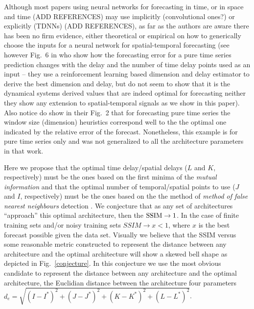 \documentclass[journal]{IEEEtran}
\begin{document}
Although most papers using neural networks for forecasting in time, or in space and time (ADD REFERENCES) may use implicitly 
(convolutional ones?) or explicitly (TDNNs) (ADD REFERENCES), as far as the authors are aware there has been no firm evidence, either 
theoretical or empirical on how to generically choose the inputs for a neural network for spatial-temporal forecasting (see however 
Fig.\ 6 in \cite{1555956} who show how the forecasting error for a pure time series prediction changes with the delay and the number of 
time delay points used as an input -- they use a reinforcement learning based dimension and delay estimator to derive the best dimension 
and delay, but do not seem to show that it is the dynamical systems derived values that are indeed optimal for forecasting neither
they show any extension to spatial-temporal signals as we show in this paper). Also notice \cite{Frank2001} do show in their Fig.\ 2
that for forecasting pure time series the window size (dimension) heuristics correspond well to the the optimal one indicated by 
the relative error of the forecast. Nonetheless, this example is for pure time series only and was not generalized to all
the architecture parameters in that work.

Here we propose that the optimal time delay/spatial delays ($L$ and $K$, respectively) must be the ones based on the first minima of the {\em mutual information}
\cite{Fraser86, abarbanel1997analysis, opac-b1092652} and that the optimal number of temporal/spatial points to use
($J$ and $I$, respectively) must be the
ones based on the
 the method of {\em method of false nearest neighbours} detection \cite{1992PhRvA..45.3403K, 1992PhRvA..45.7058M, 1993RvMP...65.1331A, 1996PhT....49k..86A, abarbanel1997analysis}. We conjecture that as any set of architectures ``approach'' this optimal
 architecture, then the $\textnormal{SSIM} \to 1$. In the case of finite training sets and/or noisy training sets $SSIM \to x<1$, where $x$ is the best
 forecast possible given the data set. Visually we believe that the SSIM versus some reasonable metric constructed to
 represent the distance between any architecture and the optimal
 architecture will show a skewed bell shape as depicted in Fig.\ \ref{conjecture}. In this conjecture we use
 the most obvious candidate to represent the distance between any architecture and the optimal
 architecture, the Euclidian distance between the architecture four parameters $d_e=\sqrt{(I-I^*)^2+(J-J^*)^2+(K-K^*)^2+(L-L^*)^2}$.
\end{document}
